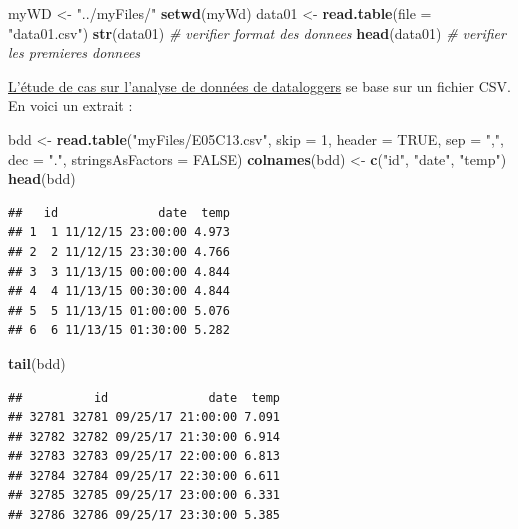 \documentclass[]{book}
\newenvironment{Shaded}{\begin{snugshade}}{\end{snugshade}}
\newcommand{\CommentTok}[1]{\textcolor[rgb]{0.56,0.35,0.01}{\textit{#1}}}
\newcommand{\DataTypeTok}[1]{\textcolor[rgb]{0.13,0.29,0.53}{#1}}
\newcommand{\DecValTok}[1]{\textcolor[rgb]{0.00,0.00,0.81}{#1}}
\newcommand{\KeywordTok}[1]{\textcolor[rgb]{0.13,0.29,0.53}{\textbf{#1}}}
\newcommand{\NormalTok}[1]{#1}
\newcommand{\OtherTok}[1]{\textcolor[rgb]{0.56,0.35,0.01}{#1}}
\newcommand{\StringTok}[1]{\textcolor[rgb]{0.31,0.60,0.02}{#1}}
\begin{document}
\begin{Shaded}
\begin{Highlighting}[]
\NormalTok{myWD <-}\StringTok{ "../myFiles/"}
\KeywordTok{setwd}\NormalTok{(myWd)}
\NormalTok{data01 <-}\StringTok{ }\KeywordTok{read.table}\NormalTok{(}\DataTypeTok{file =} \StringTok{"data01.csv"}\NormalTok{)}
\KeywordTok{str}\NormalTok{(data01) }\CommentTok{# verifier format des donnees}
\KeywordTok{head}\NormalTok{(data01) }\CommentTok{# verifier les premieres donnees}
\end{Highlighting}
\end{Shaded}

\protect\hyperlink{studyCase001}{L'étude de cas sur l'analyse de données de dataloggers} se base sur un fichier CSV. En voici un extrait :

\begin{Shaded}
\begin{Highlighting}[]
\NormalTok{bdd <-}\StringTok{ }\KeywordTok{read.table}\NormalTok{(}\StringTok{"myFiles/E05C13.csv"}\NormalTok{, }\DataTypeTok{skip =} \DecValTok{1}\NormalTok{, }\DataTypeTok{header =} \OtherTok{TRUE}\NormalTok{, }
  \DataTypeTok{sep =} \StringTok{","}\NormalTok{, }\DataTypeTok{dec =} \StringTok{"."}\NormalTok{, }\DataTypeTok{stringsAsFactors =} \OtherTok{FALSE}\NormalTok{)}
\KeywordTok{colnames}\NormalTok{(bdd) <-}\StringTok{ }\KeywordTok{c}\NormalTok{(}\StringTok{"id"}\NormalTok{, }\StringTok{"date"}\NormalTok{, }\StringTok{"temp"}\NormalTok{)}
\KeywordTok{head}\NormalTok{(bdd)}
\end{Highlighting}
\end{Shaded}

\begin{verbatim}
##   id              date  temp
## 1  1 11/12/15 23:00:00 4.973
## 2  2 11/12/15 23:30:00 4.766
## 3  3 11/13/15 00:00:00 4.844
## 4  4 11/13/15 00:30:00 4.844
## 5  5 11/13/15 01:00:00 5.076
## 6  6 11/13/15 01:30:00 5.282
\end{verbatim}

\begin{Shaded}
\begin{Highlighting}[]
\KeywordTok{tail}\NormalTok{(bdd)}
\end{Highlighting}
\end{Shaded}

\begin{verbatim}
##          id              date  temp
## 32781 32781 09/25/17 21:00:00 7.091
## 32782 32782 09/25/17 21:30:00 6.914
## 32783 32783 09/25/17 22:00:00 6.813
## 32784 32784 09/25/17 22:30:00 6.611
## 32785 32785 09/25/17 23:00:00 6.331
## 32786 32786 09/25/17 23:30:00 5.385
\end{verbatim}
\end{document}
